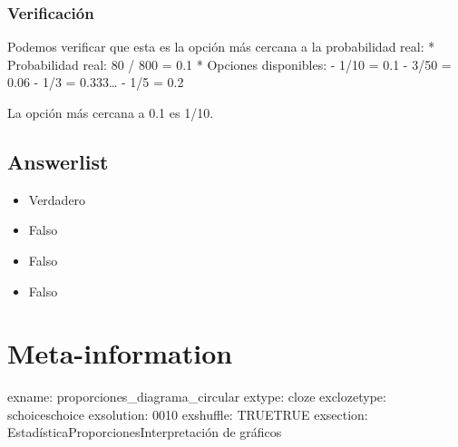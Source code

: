 \documentclass[
]{article}
\providecommand{\tightlist}{%
  \setlength{\itemsep}{0pt}\setlength{\parskip}{0pt}}
\begin{document}
\subsubsection{Verificación}\label{verificaciuxf3n}

Podemos verificar que esta es la opción más cercana a la probabilidad
real: * Probabilidad real: 80 / 800 = 0.1 * Opciones disponibles: - 1/10
= 0.1 - 3/50 = 0.06 - 1/3 = 0.333\ldots{} - 1/5 = 0.2

La opción más cercana a 0.1 es 1/10.

\subsection{Answerlist}\label{answerlist-3}

\begin{itemize}
\tightlist
\item
  Verdadero
\item
  Falso
\item
  Falso
\item
  Falso
\end{itemize}

\section{Meta-information}\label{meta-information}

exname: proporciones\_diagrama\_circular extype: cloze exclozetype:
schoice\textbar schoice exsolution: 0010 exshuffle:
TRUE\textbar TRUE exsection:
Estadística\textbar Proporciones\textbar Interpretación de gráficos
\end{document}
